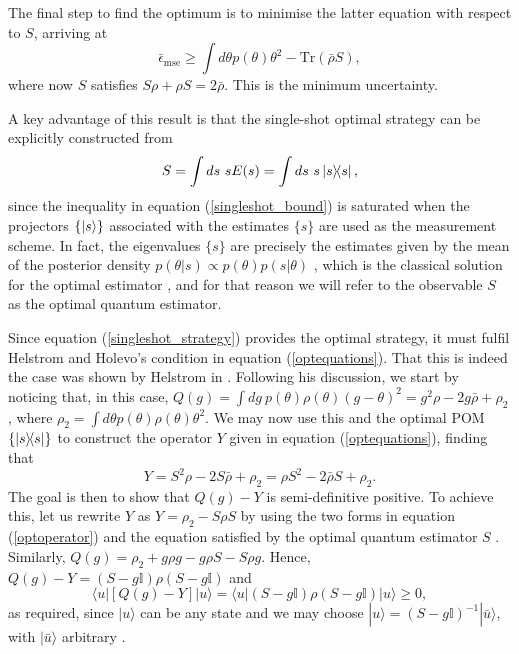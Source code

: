 The final step to find the optimum is to minimise the latter equation with respect to $S$, arriving at \cite{personick1971, macieszczak2014bayesian}
\begin{equation}
\bar{\epsilon}_{\mathrm{mse}} \geqslant \int d\theta p(\theta)\theta^2 - \mathrm{Tr}\left(\bar{\rho}S\right),
\label{singleshot_bound}
\end{equation}
where now $S$ satisfies $S\rho + \rho S  = 2\bar{\rho}$. This is the minimum uncertainty.

A key advantage of this result is that the single-shot optimal strategy can be explicitly constructed from 
\begin{equation}
S = \int ds~s E(s) = \int ds~s \ketbra{s},
\label{singleshot_strategy}
\end{equation}
since the inequality in equation (\ref{singleshot_bound}) is saturated when the projectors $\lbrace \ket{s}\rbrace$ associated with the estimates $\lbrace s\rbrace$ are used as the measurement scheme. In fact, the eigenvalues $\lbrace s\rbrace$ are precisely the estimates given by the mean of the posterior density $p(\theta|s)\propto p(\theta) p(s|\theta)$ \cite{personick1971}, which is the classical solution for the optimal estimator \cite{jaynes2003, jesus2017, rafal2015}, and for that reason we will refer to the observable $S$ as the optimal quantum estimator.

Since equation (\ref{singleshot_strategy}) provides the optimal strategy, it must fulfil Helstrom and Holevo's condition in equation (\ref{optequations}). That this is indeed the case was shown by Helstrom in \cite{helstrom1976}. Following his discussion, we start by noticing that, in this case, $Q(g) = \int dg ~ p(\theta) \rho(\theta)(g-\theta)^2 =  g^2\rho - 2 g \bar{\rho} + \rho_2$, where $\rho_2 = \int d\theta p(\theta) \rho(\theta)\theta^2$. We may now use this and the optimal POM $\lbrace \ketbra{s} \rbrace$ to construct the operator $Y$ given in equation (\ref{optequations}), finding that
\begin{equation}
Y = S^2\rho - 2 S \bar{\rho} + \rho_2 = \rho S^2 - 2 \bar{\rho} S + \rho_2.
\label{optoperator}
\end{equation}
The goal is then to show that $Q(g) - Y$ is semi-definitive positive. To achieve this, let us rewrite $Y$ as $Y = \rho_2 - S \rho S$ by using the two forms in equation (\ref{optoperator}) and the equation satisfied by the optimal quantum estimator $S$ \cite{helstrom1976}. Similarly, $Q(g) = \rho_2 + g \rho g -  g \rho S -  S \rho g$. Hence, $Q(g) - Y = (S - g\mathbb{I})\rho(S - g\mathbb{I})$ and \cite{helstrom1976}
\begin{equation}
\langle u|\left[ Q(g) - Y \right] |u\rangle = \langle u| (S - g\mathbb{I})\rho(S - g\mathbb{I}) |u\rangle \geqslant 0,
\end{equation}
as required, since $|u\rangle$ can be any state and we may choose $|u\rangle = (S - g\mathbb{I})^{-1} |\bar{u}\rangle$, with $|\bar{u}\rangle$ arbitrary \cite{helstrom1976}.

